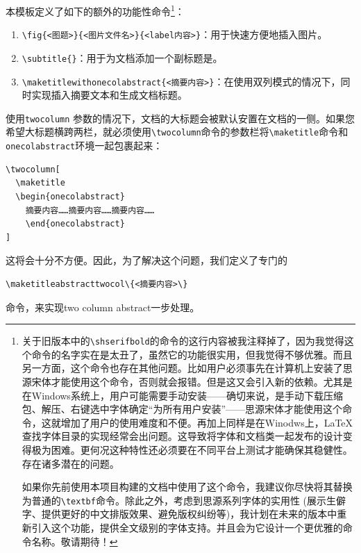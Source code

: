 本模板定义了如下的额外的功能性命令\footnote{关于旧版本中的\texttt{\textbackslash shserifbold}的命令的这行内容被我注释掉了，因为我觉得这个命令的名字实在是太丑了，虽然它的功能很实用，但我觉得不够优雅。而且另一方面，这个命令也存在其他问题。比如用户必须事先在计算机上安装了思源宋体才能使用这个命令，否则就会报错。但是这又会引入新的依赖。尤其是在Windows系统上，用户可能需要手动安装——确切来说，是手动下载压缩包、解压、右键选中字体确定“为所有用户安装”——思源宋体才能使用这个命令，这就增加了用户的使用难度和不便。再加上同样是在Winodws上，\LaTeX{}查找字体目录的实现经常会出问题。这导致将字体和文档类一起发布的设计变得极为困难。更何况这种特性还必须要在不同平台上测试才能确保其稳健性。存在诸多潜在的问题。

如果你先前使用本项目构建的文档中使用了这个命令，我建议你尽快将其替换为普通的\texttt{\textbackslash textbf}命令。除此之外，考虑到思源系列字体的实用性 (展示生僻字、提供更好的中文排版效果、避免版权纠纷等)，我计划在未来的版本中重新引入这个功能，提供全文级别的字体支持。并且会为它设计一个更优雅的命令名称。敬请期待！
}：

\begin{enumerate}
    \item \texttt{\textbackslash fig\{<图题>\}\{<图片文件名>\}\{<label内容>\}}：用于快速方便地插入图片。
    \item \texttt{\textbackslash subtitle\{\}}：用于为文档添加一个副标题是。
    \item \texttt{\textbackslash maketitlewithonecolabstract\{<摘要内容>\}}：在使用双列模式的情况下，同时实现插入摘要文本和生成文档标题。
\end{enumerate}

\begin{remark}
  使用\texttt{twocolumn} 参数的情况下，文档的大标题会被默认安置在文档的一侧。如果您希望大标题横跨两栏，就必须使用\texttt{\textbackslash twocolumn}命令的参数栏将\texttt{\textbackslash maketitle}命令和\texttt{onecolabstract}环境一起包裹起来：

\begin{verbatim}
\twocolumn[
  \maketitle
  \begin{onecolabstract}
    摘要内容……摘要内容……摘要内容……
    \end{onecolabstract}
]
\end{verbatim}

  这将会十分不方便。因此，为了解决这个问题，我们定义了专门的
\begin{verbatim}
\maketitleabstracttwocol\{<摘要内容>\}
\end{verbatim}
  命令，来实现two column abstract一步处理。
\end{remark}